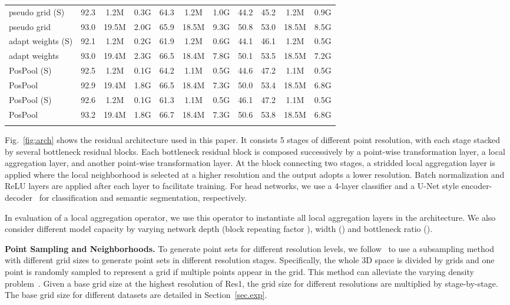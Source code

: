 \documentclass[runningheads]{llncs}
\begin{document}
\begin{small}
\begin{table}[t]
\begin{tabular}{l|ccc|ccc|cccc}
pseudo grid (S)  & 92.3& 1.2M& 0.3G& 64.3& 1.2M & 1.0G& 44.2&45.2 & 1.2M&0.9G\\
pseudo grid & 93.0& 19.5M&2.0G& 65.9& 18.5M& 9.3G&50.8 &53.0 & 18.5M& 8.5G\\
\hline
adapt weights (S) & 92.1& 1.2M& 0.2G& 61.9&  1.2M& 0.6G& 44.1& 46.1& 1.2M&0.5G\\
adapt weights & 93.0& 19.4M& 2.3G& 66.5& 18.4M& 7.8G& 50.1& 53.5& 18.5M& 7.2G\\
\Xhline{1.0pt}
PosPool (S)   & 92.5& 1.2M& 0.1G& 64.2&  1.1M& 0.5G& 44.6&47.2 &1.1M &0.5G\\
PosPool & 92.9& 19.4M& 1.8G& 66.5& 18.4M& 7.3G & 50.0& 53.4& 18.5M&6.8G \\
\hline
PosPool (S) & 92.6& 1.2M& 0.1G& 61.3&  1.1M& 0.5G& 46.1& 47.2& 1.1M&0.5G\\
PosPool &93.2 & 19.4M& 1.8G&66.7 & 18.4M& 7.3G& 50.6& 53.8& 18.5M& 6.8G\\
\Xhline{1.0pt}
\end{tabular}
\end{table}
\end{small}

Fig.~\ref{fig:arch} shows the residual architecture used in this paper. It consists 5 stages of different point resolution, with each stage stacked by several bottleneck residual blocks. Each bottleneck residual block is composed successively by a  point-wise transformation layer, a local aggregation layer, and another  point-wise transformation layer. At the block connecting two stages, a stridded local aggregation layer is applied where the local neighborhood is selected at a higher resolution and the output adopts a lower resolution. Batch normalization and ReLU layers are applied after each  layer to facilitate training. For head networks, we use a 4-layer classifier and a U-Net style encoder-decoder~\cite{Ronneberger_2015} for classification and semantic segmentation, respectively.

In evaluation of a local aggregation operator, we use this operator to instantiate all local aggregation layers in the architecture. We also consider different model capacity by varying network depth (block repeating factor ), width () and bottleneck ratio ().

\vspace{0.3em} \noindent \textbf{Point Sampling and Neighborhoods.} To generate point sets for different resolution levels, we follow~\cite{Thomas_2018,thomas2019kpconv} to use a subsampling method with different grid sizes to generate point sets in different resolution stages. Specifically, the whole 3D space is divided by grids and one point is randomly sampled to represent a grid if multiple points appear in the grid. This method can alleviate the varying density problem~\cite{Thomas_2018,thomas2019kpconv}. Given a base grid size at the highest resolution of Res1, the grid size for different resolutions are multiplied by  stage-by-stage. The base grid size for different datasets are detailed in Section~\ref{sec.exp}.
\end{document}
